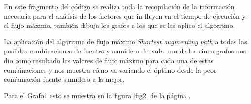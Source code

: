 \documentclass{article}
\begin{document}
En este fragmento del código se realiza toda la recopilación de la información necesaria para el análisis de los factores que in fluyen en el tiempo de ejecución y el flujo máximo, también dibuja los grafos a los que se les aplico el algoritmo. 
\begin{center}

\end{center}
La aplicación del algoritmo de flujo máximo \textit{Shortest augmenting path} a todas las posibles combinaciones de fuentes y sumidero de cada uno de los cinco grafos nos dio como resultado los valores de flujo máximo para cada una de estas combinaciones y nos muestra cómo va variando el óptimo desde la peor combinación fuente sumidero a la mejor.

Para el Grafo1 esto se muestra en la figura \ref{fig2} de la página \pageref{fig2}.
\end{document}

